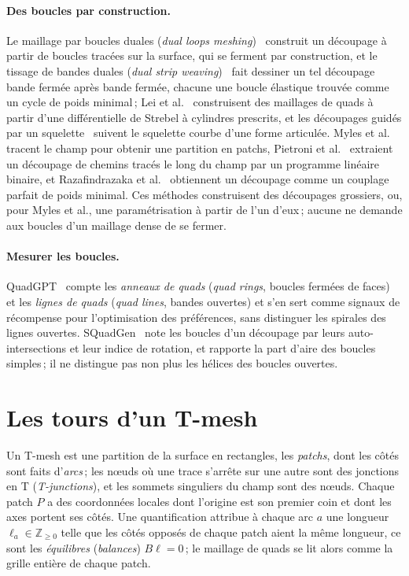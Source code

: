 \documentclass[11pt,a4paper]{article}
\newcommand{\Z}{\mathbb{Z}}
\begin{document}
\paragraph{Des boucles par construction.}
Le maillage par boucles duales (\emph{dual loops
meshing})~\cite{campen2012dual} construit un découpage à partir de boucles
tracées sur la surface, qui se ferment par construction, et le tissage de
bandes duales (\emph{dual strip weaving})~\cite{campen2014weaving} fait
dessiner un tel découpage bande fermée après bande fermée, chacune une boucle
élastique trouvée comme un cycle de poids minimal\,; Lei et
al.~\cite{lei2017foliation} construisent des maillages de quads à partir
d'une différentielle de Strebel à cylindres prescrits, et les découpages
guidés par un squelette~\cite{usai2015skeleton} suivent le squelette
courbe d'une forme articulée. Myles et al.~\cite{myles2014robust} tracent le
champ pour obtenir une partition en patchs, Pietroni et
al.~\cite{pietroni2016tracing} extraient un découpage de chemins tracés le
long du champ par un programme linéaire binaire, et Razafindrazaka et
al.~\cite{razafindrazaka2015perfect} obtiennent un découpage comme un
couplage parfait de poids minimal. Ces méthodes construisent des découpages
grossiers, ou, pour Myles et al., une paramétrisation à partir de l'un
d'eux\,; aucune ne demande aux boucles d'un maillage dense de se fermer.

\paragraph{Mesurer les boucles.}
QuadGPT~\cite{liu2025quadgpt} compte les \emph{anneaux de quads}
(\emph{quad rings}, boucles fermées de faces) et les \emph{lignes de quads}
(\emph{quad lines}, bandes ouvertes) et s'en sert comme signaux de
récompense pour l'optimisation des préférences, sans distinguer les spirales
des lignes ouvertes. SQuadGen~\cite{kong2026squadgen} note les boucles d'un
découpage par leurs auto-intersections et leur indice de rotation, et
rapporte la part d'aire des boucles simples\,; il ne distingue pas non plus
les hélices des boucles ouvertes.

\section{Les tours d'un T-mesh}\label{sec:turns}

Un T-mesh est une partition de la surface en rectangles, les \emph{patchs},
dont les côtés sont faits d'\emph{arcs}\,; les nœuds où une trace s'arrête
sur une autre sont des jonctions en T (\emph{T-junctions}), et les sommets
singuliers du champ sont des nœuds. Chaque patch $P$ a des coordonnées
locales dont l'origine est son premier coin et dont les axes portent ses
côtés. Une quantification attribue à chaque arc $a$ une longueur $\ell_a \in
\Z_{\ge 0}$ telle que les côtés opposés de chaque patch aient la même
longueur, ce sont les \emph{équilibres} (\emph{balances}) $B\ell = 0$\,; le
maillage de quads se lit alors comme la grille entière de chaque patch.
\end{document}
